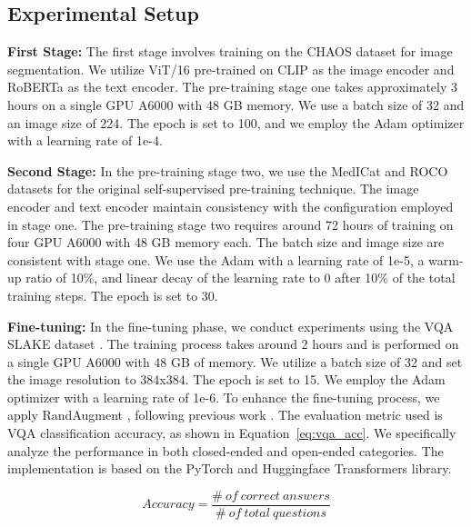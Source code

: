 \subsection{Experimental Setup}\label{setup}

{\bf First Stage:} 
The first stage involves training on the CHAOS dataset \cite{kavur2021chaos} for image segmentation. We utilize ViT/16 \cite{dosovitskiy2020vit} pre-trained on CLIP \cite{radford2021learning} as the image encoder and RoBERTa \cite{zhuang-etal-2021-robustly} as the text encoder. The pre-training stage one takes approximately 3 hours on a single GPU A6000 with 48 GB memory. We use a batch size of 32 and an image size of 224. The epoch is set to 100, and we employ the Adam optimizer \cite{kingma2015adam} with a learning rate of 1e-4. 

{\bf Second Stage:} 
In the pre-training stage two, we use the MedICat \cite{subramanian-2020-medicat} and ROCO datasets \cite{Pelka2018RadiologyOI} for the original self-supervised pre-training technique. The image encoder and text encoder maintain consistency with the configuration employed in stage one. The pre-training stage two requires around 72 hours of training on four GPU A6000 with 48 GB memory each. The batch size and image size are consistent with stage one. We use the Adam  \cite{kingma2015adam} with a learning rate of 1e-5, a warm-up ratio of 10\%, and linear decay of the learning rate to 0 after 10\% of the total training steps. The epoch is set to 30. 

{\bf Fine-tuning:}
In the fine-tuning phase, we conduct experiments using the VQA SLAKE dataset \cite{liu2021slake}. The training process takes around 2 hours and is performed on a single GPU A6000 with 48 GB of memory. We utilize a batch size of 32 and set the image resolution to 384x384. The epoch is set to 15. We employ the Adam optimizer \cite{kingma2015adam} with a learning rate of 1e-6. To enhance the fine-tuning process, we apply RandAugment \cite{cubuk2020randaugment}, following previous work \cite{Dou_2022_CVPR}. The evaluation metric used is VQA classification accuracy, as shown in Equation~\ref{eq:vqa_acc}. We specifically analyze the performance in both closed-ended and open-ended categories. The implementation is based on the PyTorch \cite{paszke2017automatic} and Huggingface \cite{wolf2019huggingface} Transformers library.

\begin{equation}\label{eq:vqa_acc}
    Accuracy = {\frac{\#\ of\ correct\ answers}{\#\ of\ total\ questions}}
\end{equation}

